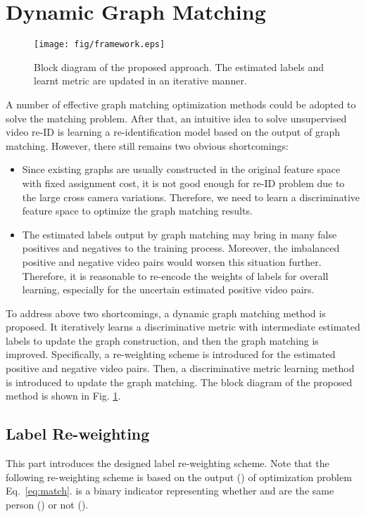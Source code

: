 \documentclass[10pt,twocolumn,letterpaper]{article}
\begin{document}
\section{Dynamic Graph Matching}\label{sec:metric}
\begin{figure}[t]
  \centering
  \texttt{[image: fig/framework.eps]}\\
  \caption{\small{Block diagram of the proposed approach. The estimated labels and learnt metric are updated in an iterative manner. }}\label{fig:frame}
\end{figure}
A number of effective graph matching optimization methods could be adopted to solve the matching problem. After that, an intuitive idea to solve unsupervised video re-ID is learning a re-identification model based on the output of graph matching. However, there still remains two obvious shortcomings:
 \begin{itemize}
\item Since existing graphs are usually constructed in the original feature space with fixed assignment cost, it is not good enough for re-ID problem due to the large cross camera variations. Therefore, we need to learn a discriminative feature space to optimize the graph matching results.
\item The estimated labels output by graph matching may bring in many false positives and negatives to the training process. Moreover, the imbalanced positive and negative video pairs would worsen this situation further. Therefore, it is reasonable to re-encode the weights of labels for overall learning, especially for the uncertain estimated positive video pairs.
 \end{itemize}
To address above two shortcomings, a dynamic graph matching method is proposed. It iteratively learns a discriminative metric with intermediate estimated labels to update the graph construction, and then the graph matching is improved. Specifically, a re-weighting scheme is introduced for the estimated positive and negative video pairs. Then, a discriminative metric learning method is introduced to update the graph matching. The block diagram of the proposed method is shown in Fig. \ref{fig:frame}.
\subsection{Label Re-weighting}
This part introduces the designed label re-weighting scheme. Note that the following re-weighting scheme is based on the output () of optimization problem Eq.~\ref{eq:match}.  is a binary indicator representing whether  and  are the same person () or not ().
\end{document}

